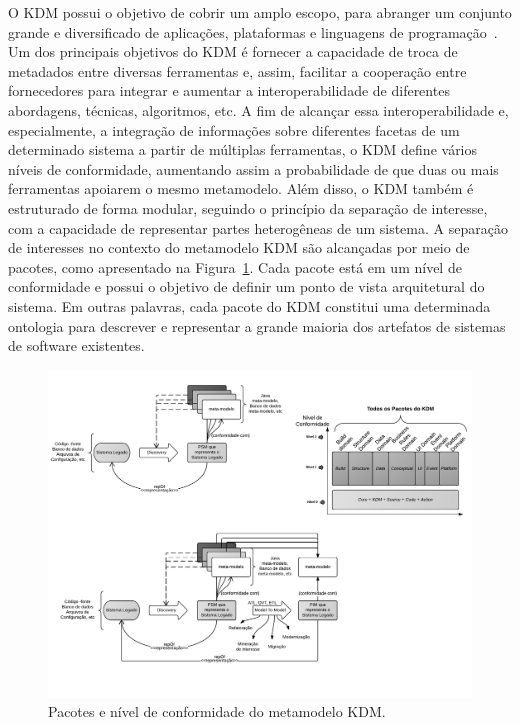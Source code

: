 \documentclass[12pt]{article}
\begin{document}
O KDM possui o objetivo de cobrir um amplo escopo, para abranger um conjunto grande e diversificado de aplicações, plataformas e linguagens de programação~\cite{KDM:specification, PerezCastillo:2011jo}. Um dos principais objetivos do KDM é fornecer a capacidade de troca de metadados entre diversas ferramentas e, assim, facilitar a cooperação entre fornecedores para integrar e aumentar a interoperabilidade de diferentes abordagens, técnicas, algoritmos, etc. A fim de alcançar essa interoperabilidade e, especialmente, a integração de informações sobre diferentes facetas de um determinado sistema a partir de múltiplas ferramentas, o KDM define vários níveis de conformidade, aumentando assim a probabilidade de que duas ou mais ferramentas apoiarem o mesmo metamodelo. Além disso, o KDM também é estruturado de forma modular, seguindo o princípio da separação de interesse, com a capacidade de representar partes heterogêneas de um sistema. A separação de interesses no contexto do metamodelo KDM são alcançadas por meio de pacotes, como apresentado na Figura~\ref{kdm:domain}. Cada pacote está em um nível de conformidade e possui o objetivo de definir um ponto de vista arquitetural do sistema. Em outras palavras, cada pacote do KDM constitui uma determinada ontologia para descrever e representar a grande maioria dos artefatos de sistemas de software existentes. 

\begin{figure}[htb]
 \centering
 \includegraphics[scale=1]{kdmLevels_pacotes.pdf}
 \caption{Pacotes e nível de conformidade do metamodelo KDM.}
 \label{kdm:domain} 
\end{figure}
\end{document}
